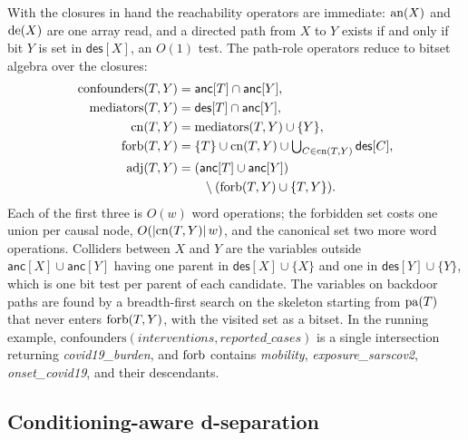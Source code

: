 With the closures in hand the reachability operators are immediate: $\mathrm{an}(X)$
and $\mathrm{de}(X)$ are one array read, and a directed path from $X$ to $Y$ exists if
and only if bit $Y$ is set in $\textsf{des}[X]$, an $O(1)$ test. The path-role
operators reduce to bitset algebra over the closures:
{\small
\begin{align*}
  \text{confounders}(T,Y) &= \textsf{anc}[T] \cap \textsf{anc}[Y], \\
  \text{mediators}(T,Y)   &= \textsf{des}[T] \cap \textsf{anc}[Y], \\
  \mathrm{cn}(T,Y)   &= \text{mediators}(T,Y) \cup \{Y\}, \\
  \mathrm{forb}(T,Y) &= \{T\} \cup \mathrm{cn}(T,Y) \cup \textstyle\bigcup_{C \in \mathrm{cn}(T,Y)} \textsf{des}[C], \\
  \mathrm{adj}(T,Y)  &= (\textsf{anc}[T] \cup \textsf{anc}[Y]) \\
             &\qquad \setminus (\mathrm{forb}(T,Y) \cup \{T,Y\}).
\end{align*}}
Each of the first three is $O(w)$ word operations; the forbidden set costs
one union per causal node, $O(|\mathrm{cn}(T,Y)|\, w)$, and the canonical set two
more word operations. Colliders between $X$ and $Y$ are the variables outside
$\textsf{anc}[X] \cup \textsf{anc}[Y]$ having one parent in
$\textsf{des}[X] \cup \{X\}$ and one in $\textsf{des}[Y] \cup \{Y\}$, which
is one bit test per parent of each candidate. The variables on backdoor paths
are found by a breadth-first search on the skeleton starting from $\mathrm{pa}(T)$
that never enters $\mathrm{forb}(T,Y)$, with the visited set as a bitset. In the
running example, $\text{confounders}(\textit{interventions},
\textit{reported\_cases})$ is a single intersection returning
\textit{covid19\_burden}, and $\mathrm{forb}$ contains \textit{mobility},
\textit{exposure\_sarscov2}, \textit{onset\_covid19}, and their descendants.

\subsection{Conditioning-aware d-separation}\label{sec:index:dsep}

